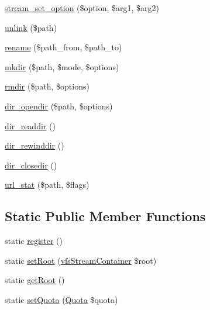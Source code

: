 \begin{DoxyCompactItemize}
\item 
\mbox{\hyperlink{classorg_1_1bovigo_1_1vfs_1_1vfs_stream_wrapper_a0758ac0913bc66f471a24637532e8721}{stream\+\_\+set\+\_\+option}} (\$option, \$arg1, \$arg2)
\item 
\mbox{\hyperlink{classorg_1_1bovigo_1_1vfs_1_1vfs_stream_wrapper_ad6244fc254de2b00ab567e4e0b82a4b3}{unlink}} (\$path)
\item 
\mbox{\hyperlink{classorg_1_1bovigo_1_1vfs_1_1vfs_stream_wrapper_a6572ee8e63a1c3360385286ac209e0ff}{rename}} (\$path\+\_\+from, \$path\+\_\+to)
\item 
\mbox{\hyperlink{classorg_1_1bovigo_1_1vfs_1_1vfs_stream_wrapper_a028d2a37cc45234816b36df648b87764}{mkdir}} (\$path, \$mode, \$options)
\item 
\mbox{\hyperlink{classorg_1_1bovigo_1_1vfs_1_1vfs_stream_wrapper_a62be97a557af790550eb7558dfa5859a}{rmdir}} (\$path, \$options)
\item 
\mbox{\hyperlink{classorg_1_1bovigo_1_1vfs_1_1vfs_stream_wrapper_ae6bbfde9534ee882c5e750dc64391762}{dir\+\_\+opendir}} (\$path, \$options)
\item 
\mbox{\hyperlink{classorg_1_1bovigo_1_1vfs_1_1vfs_stream_wrapper_aa4876e0cb8d21e65c36ca6243e6f5182}{dir\+\_\+readdir}} ()
\item 
\mbox{\hyperlink{classorg_1_1bovigo_1_1vfs_1_1vfs_stream_wrapper_afd6e9558104fd35d07fb3a7412ea0d90}{dir\+\_\+rewinddir}} ()
\item 
\mbox{\hyperlink{classorg_1_1bovigo_1_1vfs_1_1vfs_stream_wrapper_a9f2a581f636224b826e531c63953a907}{dir\+\_\+closedir}} ()
\item 
\mbox{\hyperlink{classorg_1_1bovigo_1_1vfs_1_1vfs_stream_wrapper_abcc2fea2362bdc22b2a1c9387176429c}{url\+\_\+stat}} (\$path, \$flags)
\end{DoxyCompactItemize}
\subsection*{Static Public Member Functions}
\begin{DoxyCompactItemize}
\item 
static \mbox{\hyperlink{classorg_1_1bovigo_1_1vfs_1_1vfs_stream_wrapper_a610b9c89b82e11ea426e1804874a6ef4}{register}} ()
\item 
static \mbox{\hyperlink{classorg_1_1bovigo_1_1vfs_1_1vfs_stream_wrapper_a9e895af9df4006a20d6dcbe4747398a2}{set\+Root}} (\mbox{\hyperlink{interfaceorg_1_1bovigo_1_1vfs_1_1vfs_stream_container}{vfs\+Stream\+Container}} \$root)
\item 
static \mbox{\hyperlink{classorg_1_1bovigo_1_1vfs_1_1vfs_stream_wrapper_a41ee3f839f887a3c6313dec895016761}{get\+Root}} ()
\item 
static \mbox{\hyperlink{classorg_1_1bovigo_1_1vfs_1_1vfs_stream_wrapper_a1f9bcaae41981cb5540bd2ca82e64186}{set\+Quota}} (\mbox{\hyperlink{classorg_1_1bovigo_1_1vfs_1_1_quota}{Quota}} \$quota)
\end{DoxyCompactItemize}
